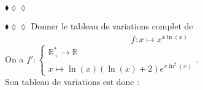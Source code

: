 \documentclass[11pt]{article}
\begin{document}
\begin{exercice}{$\blacklozenge\lozenge\lozenge$}{}
\begin{itemize}
    \end{itemize}
\end{exercice}

\begin{exercice}{$\blacklozenge\lozenge\lozenge$}{}
    Donner le tableau de variations complet de
    \begin{align*}
        f:x\mapsto x^{x\ln(x)}
    \end{align*}
    \tcblower
    On a $f':\begin{cases}\mathbb{R}_+^*\rightarrow\mathbb{R}\\x\mapsto\ln(x)(\ln(x)+2)e^{x\ln^2(x)}\end{cases}$.\\
    Son tableau de variations est donc :\vspace*{0.2cm}
    \begin{center}
    \end{center}
\end{exercice}
\end{document}
